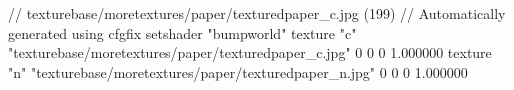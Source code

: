 // texturebase/moretextures/paper/texturedpaper_c.jpg (199)
// Automatically generated using cfgfix
setshader "bumpworld"
texture "c" "texturebase/moretextures/paper/texturedpaper_c.jpg" 0 0 0 1.000000
texture "n" "texturebase/moretextures/paper/texturedpaper_n.jpg" 0 0 0 1.000000
